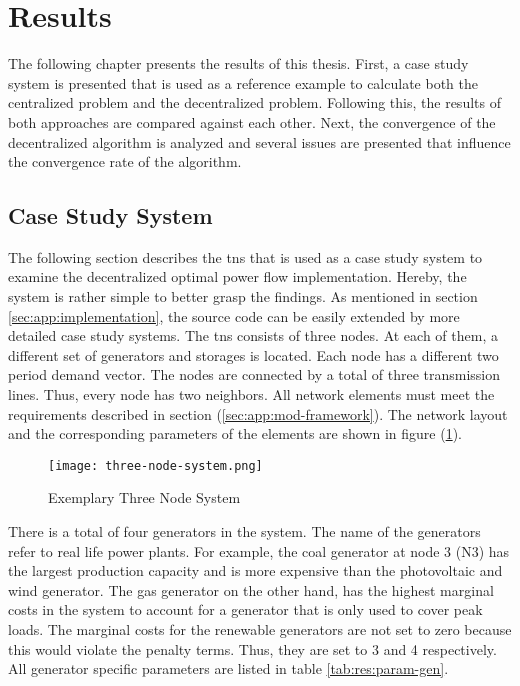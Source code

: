 \section{Results}
\label{sec:res}

The following chapter presents the results of this thesis. First, a case study system is presented that is used as a reference example to calculate both the centralized problem and the decentralized problem. Following this, the results of both approaches are compared against each other. Next, the convergence of the decentralized algorithm is analyzed and several issues are presented that influence the convergence rate of the algorithm.

\subsection{Case Study System}
\label{sec:res:tns}

The following section describes the \gls{tns} that is used as a case study system to examine the decentralized optimal power flow implementation. Hereby, the system is rather simple to better grasp the findings. As mentioned in section \ref{sec:app:implementation}, the source code can be easily extended by more detailed case study systems. The \gls{tns} consists of three nodes. At each of them, a different set of generators and storages is located. Each node has a different two period demand vector. The nodes are connected by a total of three transmission lines. Thus, every node has two neighbors. All network elements must meet the requirements described in section (\ref{sec:app:mod-framework}). The network layout and the corresponding parameters of the elements are shown in figure (\ref{fig:tns}).

\begin{figure}[h]
	\centering
	\texttt{[image: three-node-system.png]}
	\caption{Exemplary Three Node System}
	\label{fig:tns}
\end{figure}

There is a total of four generators in the system. The name of the generators refer to real life power plants. For example, the coal generator at node 3 (N3) has the largest production capacity and is more expensive than the photovoltaic and wind generator. The gas generator on the other hand, has the highest marginal costs in the system to account for a generator that is only used to cover peak loads. The marginal costs for the renewable generators are not set to zero because this would violate the penalty terms. Thus, they are set to 3 and 4 respectively. All generator specific parameters are listed in table \ref{tab:res:param-gen}.

